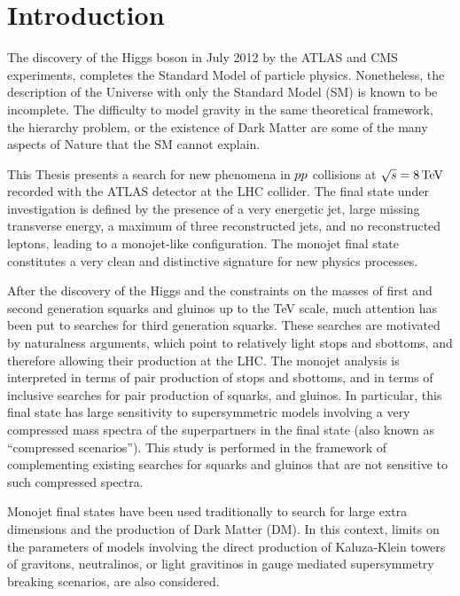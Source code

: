 \chapter{Introduction}
    \label{chapter:Introduction}

The discovery of the Higgs boson in July 2012 by the ATLAS and CMS experiments, completes the Standard Model of particle physics.
Nonetheless, the description of the Universe with only the Standard Model (SM) is known to be incomplete.
The difficulty to model gravity in the same theoretical framework, the hierarchy problem, or the existence of Dark Matter are some of the many aspects of Nature that the SM cannot explain.

This Thesis presents a search for new phenomena in $pp$ collisions at $\sqrt{s}=\unit[8]{TeV}$ recorded with the ATLAS detector at the LHC collider.
The final state under investigation is defined by the presence of a very energetic jet, large missing transverse energy, a maximum of three reconstructed jets, and no reconstructed leptons, leading to a monojet-like configuration.
The monojet final state constitutes a very clean and distinctive signature for new physics processes.

After the discovery of the Higgs and the constraints on the masses of first and second generation squarks and gluinos up to the TeV scale, much attention has been put to searches for third generation squarks.
These searches are motivated by naturalness arguments, which point to relatively light stops and sbottoms, and therefore allowing their production at the LHC.
The monojet analysis is interpreted in terms of pair production of stops and sbottoms, and in terms of inclusive searches for pair production of squarks, and gluinos.
In particular, this final state has large sensitivity to supersymmetric models involving a very compressed mass spectra of the superpartners in the final state (also known as ``compressed scenarios'').
This study is performed in the framework of complementing existing searches for squarks and gluinos that are not sensitive to such compressed spectra.

Monojet final states have been used traditionally to search for large extra dimensions and the production of Dark Matter (DM).
In this context, limits on the parameters of models involving the direct production of Kaluza-Klein towers of gravitons, neutralinos, or light gravitinos in gauge mediated supersymmetry breaking scenarios, are also considered.

